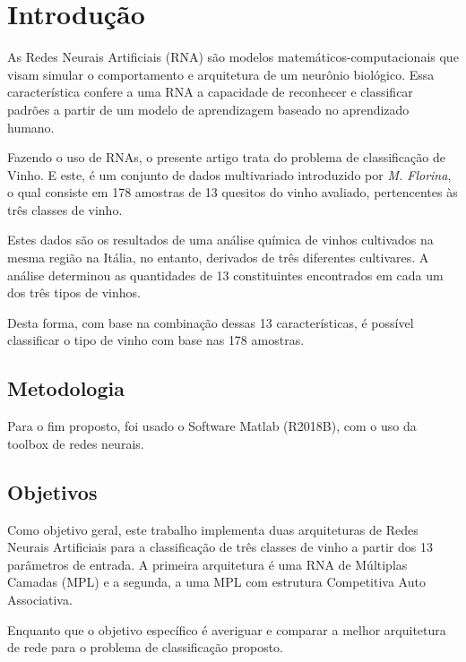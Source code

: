 
\section{Introdução} \label{introducao}

As Redes Neurais Artificiais (RNA) são modelos matemáticos-computacionais que visam simular o comportamento e arquitetura de um neurônio biológico. Essa característica confere a uma RNA a capacidade de reconhecer e classificar padrões a partir de um modelo de aprendizagem baseado no aprendizado humano.

Fazendo o uso de RNAs, o presente artigo trata do problema de classificação de Vinho. E este, é um conjunto de dados multivariado introduzido por \textit{M. Florina}, o qual consiste em 178 amostras de 13 quesitos do vinho avaliado, pertencentes às três classes de vinho.

Estes dados são os resultados de uma análise química de vinhos cultivados na mesma região na Itália, no entanto, derivados de três diferentes cultivares. A análise determinou as quantidades de 13 constituintes encontrados em cada um dos três tipos de vinhos.

Desta forma, com base na combinação dessas 13 características, é possível classificar o tipo de vinho com base nas 178 amostras.

\subsection{Metodologia}

Para o fim proposto, foi usado o Software Matlab (R2018B), com o uso da toolbox de redes neurais.


\subsection{Objetivos}

Como objetivo geral, este trabalho implementa duas arquiteturas de Redes Neurais Artificiais para a classificação de três classes de vinho a partir dos 13 parâmetros de entrada. A primeira arquitetura é uma RNA de Múltiplas Camadas (MPL) e a segunda, a uma MPL com estrutura Competitiva Auto Associativa.

Enquanto que o objetivo específico é averiguar e comparar a melhor arquitetura de rede para o problema de classificação proposto.


